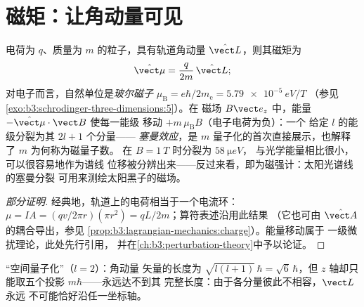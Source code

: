 \section{磁矩：让角动量可见}

\begin{proposition}[轨道磁矩与塞曼效应]\label{prop:b3:quantum-angular-momentum:magnetic}
电荷为 $q$、质量为 $m$ 的粒子，具有轨道角动量
$\hat{\vect L}$，则其磁矩为
\[
\hat{\vect\mu} = \frac{q}{2m}\,\hat{\vect L} ;
\]
对电子而言，自然单位是\emph{玻尔磁子}
$\mu_{\text{B}} = e\hbar/2m_{\text{e}} = \qty{5.79e-5}{eV/T}$
（参见\cref{exo:b3:schrodinger-three-dimensions:5}）。在
磁场 $B\vect e_z$ 中，能量 $-\hat{\vect\mu}\cdot\vect B$ 使每一能级
移动 $+m\,\mu_{\text{B}}B$（电子电荷为负）：一个
给定 $l$ 的能级分裂为其 $2l + 1$ 个分量——
\emph{塞曼效应}，是
$m$ 量子化的首次直接展示，也解释了 $m$ 为何称为磁量子数。
在 $B = \qty{1}{T}$ 时分裂为 $\qty{58}{\micro eV}$，
与光学能量相比很小，可以很容易地作为谱线
位移被分辨出来——反过来看，即为磁强计：太阳光谱线的塞曼分裂
可用来测绘太阳黑子的磁场。
\end{proposition}

\begin{proof}[部分证明]
经典地，轨道上的电荷相当于一个电流环：$\mu = IA =
(qv/2\pi r)(\pi r^2) = qL/2m$；算符表述沿用此结果
（它也可由 $\hat{\vect A}$ 的耦合导出，参见
\cref{prop:b3:lagrangian-mechanics:charge}）。能量移动属于
一级微扰理论，此处先行引用，
并在\cref{ch:b3:perturbation-theory}中予以论证。
\end{proof}

\begin{omfigure}

{\small “空间量子化”（$l = 2$）：角动量
矢量的长度为 $\sqrt{l(l+1)}\,\hbar = \sqrt6\,\hbar$，但
$z$ 轴却只能取五个投影 $m\hbar$——永远达不到其
完整长度：由于各分量彼此不相容，$\vect L$ 永远
不可能恰好沿任一坐标轴。}
\end{omfigure}

